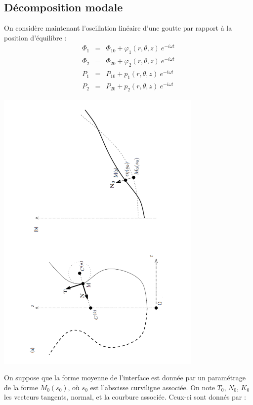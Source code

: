 \documentclass[a4paper]{report}
\begin{document}
\subsection{Décomposition modale}
On considère maintenant l'oscillation linéaire d'une goutte par rapport à la position d'équilibre :
\begin{eqnarray*}
\varPhi_1   &=& \varPhi_{10} + \varphi_1(r,\theta,z)\ e^{- i \omega t} \\
\varPhi_2   &=& \varPhi_{20} + \varphi_2(r,\theta,z)\ e^{- i \omega t} \\
P_1         &=& P_{10} + p_1(r,\theta,z)\ e^{- i \omega t}\\
P_2         &=& P_{20} + p_2(r,\theta,z)\ e^{- i \omega t}
\end{eqnarray*}
\begin{center}
\includegraphics[width=10cm, angle=270]{5}
\end{center}
On suppose que la forme moyenne de l'interface est donnée par un paramétrage de la forme $M_0(s_0)$, où $s_0$ est l'abscisse curviligne associée. On note $T_0$, $N_0$, $K_0$ les vecteurs tangents, normal, et la courbure associée. Ceux-ci sont donnés par :
\\[0.25cm]
\end{document}

